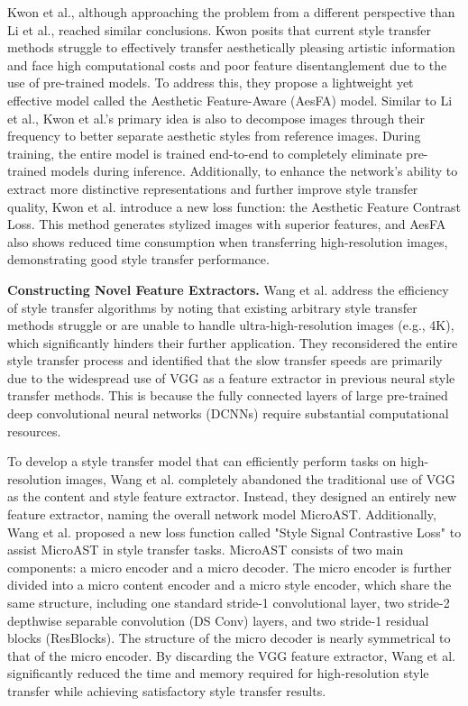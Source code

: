 Kwon et al.\citep{71kwon2024aesfa}, although approaching the problem from a different perspective than Li et al.\citep{03li2023frequency}, reached similar conclusions. Kwon posits that current style transfer methods struggle to effectively transfer aesthetically pleasing artistic information and face high computational costs and poor feature disentanglement due to the use of pre-trained models. To address this, they propose a lightweight yet effective model called the Aesthetic Feature-Aware (AesFA) model. Similar to Li et al.\citep{03li2023frequency}, Kwon et al.'s primary idea is also to decompose images through their frequency to better separate aesthetic styles from reference images. During training, the entire model is trained end-to-end to completely eliminate pre-trained models during inference. Additionally, to enhance the network's ability to extract more distinctive representations and further improve style transfer quality, Kwon et al. introduce a new loss function: the Aesthetic Feature Contrast Loss. This method generates stylized images with superior features, and AesFA also shows reduced time consumption when transferring high-resolution images, demonstrating good style transfer performance.

\textbf{Constructing Novel Feature Extractors.} \quad Wang et al.\citep{72wang2023microast} address the efficiency of style transfer algorithms by noting that existing arbitrary style transfer methods struggle or are unable to handle ultra-high-resolution images (e.g., 4K), which significantly hinders their further application. They reconsidered the entire style transfer process and identified that the slow transfer speeds are primarily due to the widespread use of VGG\citep{25simonyan2014very} as a feature extractor in previous neural style transfer methods. This is because the fully connected layers of large pre-trained deep convolutional neural networks (DCNNs) require substantial computational resources.

To develop a style transfer model that can efficiently perform tasks on high-resolution images, Wang et al. completely abandoned the traditional use of VGG\citep{25simonyan2014very} as the content and style feature extractor. Instead, they designed an entirely new feature extractor, naming the overall network model MicroAST. Additionally, Wang et al. proposed a new loss function called "Style Signal Contrastive Loss" to assist MicroAST in style transfer tasks. MicroAST consists of two main components: a micro encoder and a micro decoder. The micro encoder is further divided into a micro content encoder and a micro style encoder, which share the same structure, including one standard stride-1 convolutional layer, two stride-2 depthwise separable convolution (DS Conv) layers, and two stride-1 residual blocks (ResBlocks). The structure of the micro decoder is nearly symmetrical to that of the micro encoder. By discarding the VGG\citep{25simonyan2014very} feature extractor, Wang et al. significantly reduced the time and memory required for high-resolution style transfer while achieving satisfactory style transfer results.


